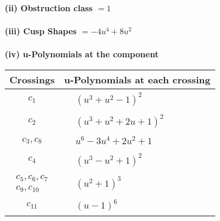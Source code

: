 \documentclass[1p]{elsarticle_modified}
\theoremstyle{definition}
\begin{document}
\flushleft \textbf{(ii) Obstruction class $= 1$}\\~\\
\flushleft \textbf{(iii) Cusp Shapes $= -4 u^4+8 u^2$}\\~\\
\newpage\renewcommand{\arraystretch}{1}
\flushleft \textbf{(iv) u-Polynomials at the component}\newline \\
\begin{tabular}{m{50pt}|m{274pt}}
Crossings & \hspace{64pt}u-Polynomials at each crossing \\
\hline $$\begin{aligned}c_{1}\end{aligned}$$&$\begin{aligned}
&(u^3+u^2-1)^2
\end{aligned}$\\
\hline $$\begin{aligned}c_{2}\end{aligned}$$&$\begin{aligned}
&(u^3+u^2+2 u+1)^2
\end{aligned}$\\
\hline $$\begin{aligned}c_{3},c_{8}\end{aligned}$$&$\begin{aligned}
&u^6-3 u^4+2 u^2+1
\end{aligned}$\\
\hline $$\begin{aligned}c_{4}\end{aligned}$$&$\begin{aligned}
&(u^3- u^2+1)^2
\end{aligned}$\\
\hline $$\begin{aligned}c_{5},c_{6},c_{7}\\c_{9},c_{10}\end{aligned}$$&$\begin{aligned}
&(u^2+1)^3
\end{aligned}$\\
\hline $$\begin{aligned}c_{11}\end{aligned}$$&$\begin{aligned}
&(u-1)^6
\end{aligned}$\\
\hline
\end{tabular}\\~\\
\end{document}
